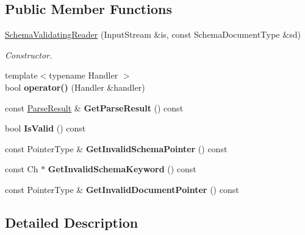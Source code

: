 \subsection*{Public Member Functions}
\begin{DoxyCompactItemize}
\item 
\hyperlink{classSchemaValidatingReader_ae7945b71687ad3dd13b9c3d096892eac}{Schema\+Validating\+Reader} (Input\+Stream \&is, const Schema\+Document\+Type \&sd)
\begin{DoxyCompactList}\small\item\em Constructor. \end{DoxyCompactList}\item 
\mbox{\label{classSchemaValidatingReader_a7135d8d53aacd850fbce2901cca4a4c3}} 
{\footnotesize template$<$typename Handler $>$ }\\bool {\bfseries operator()} (Handler \&handler)
\item 
\mbox{\label{classSchemaValidatingReader_add1def2be62e1443a88c7792e5b34e3b}} 
const \hyperlink{structParseResult}{Parse\+Result} \& {\bfseries Get\+Parse\+Result} () const
\item 
\mbox{\label{classSchemaValidatingReader_a3c04fa90a430a67a993a2b8876e89ff4}} 
bool {\bfseries Is\+Valid} () const
\item 
\mbox{\label{classSchemaValidatingReader_a9accbbcbe9afbbe26300d943ccb46362}} 
const Pointer\+Type \& {\bfseries Get\+Invalid\+Schema\+Pointer} () const
\item 
\mbox{\label{classSchemaValidatingReader_ac3192b08923b4d68d04462b0b61ded1c}} 
const Ch $\ast$ {\bfseries Get\+Invalid\+Schema\+Keyword} () const
\item 
\mbox{\label{classSchemaValidatingReader_a53051bfc38cb24368fc40e4334102da8}} 
const Pointer\+Type \& {\bfseries Get\+Invalid\+Document\+Pointer} () const
\end{DoxyCompactItemize}


\subsection{Detailed Description}
